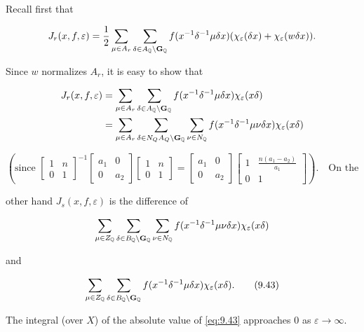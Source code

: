 Recall first that

\[
J_r(x, f, \varepsilon) = \frac{1}{2}\sum_{\mu \in A_r}\sum_{\delta \in A_{\mathbb{Q}} \backslash \mathbf{G}_{\mathbb{Q}}} f(x^{-1}\delta^{-1}\mu\delta x)(\chi_\varepsilon(\delta x) + \chi_\varepsilon(w\delta x)).
\]

Since $w$ normalizes $A_r$, it is easy to show that

\[
\begin{aligned}
J_r(x, f, \varepsilon) &= \sum_{\mu \in A_r}\sum_{\delta \in A_{\mathbb{Q}} \backslash \mathbf{G}_{\mathbb{Q}}} f(x^{-1}\delta^{-1}\mu\delta x)\chi_\varepsilon(x\delta)\\
&= \sum_{\mu \in A_r}\sum_{\delta \in N_Q A_Q \backslash \mathbf{G}_{\mathbb{Q}}}\sum_{\nu \in N_{\mathbb{Q}}} f(x^{-1}\delta^{-1}\mu\nu\delta x)\chi_\varepsilon(x\delta)
\end{aligned}
\]

\[
\left(\text{since } \begin{bmatrix} 1 & n \\ 0 & 1 \end{bmatrix}^{-1}\begin{bmatrix} a_1 & 0 \\ 0 & a_2 \end{bmatrix}\begin{bmatrix} 1 & n \\ 0 & 1 \end{bmatrix} = \begin{bmatrix} a_1 & 0 \\ 0 & a_2 \end{bmatrix}\begin{bmatrix} 1 & \frac{n(a_1 - a_2)}{a_1} \\ 0 & 1 \end{bmatrix}\right). \quad \text{On the}
\]

other hand $J_s(x, f, \varepsilon)$ is the difference of

\[
\sum_{\mu \in Z_{\mathbb{Q}}}\sum_{\delta \in B_{\mathbb{Q}} \backslash \mathbf{G}_{\mathbb{Q}}}\sum_{\nu \in N_{\mathbb{Q}}} f(x^{-1}\delta^{-1}\mu\nu\delta x)\chi_\varepsilon(x\delta)
\]

and

\begin{equation}\label{eq:9.43}
\sum_{\mu \in Z_{\mathbb{Q}}}\sum_{\delta \in B_{\mathbb{Q}} \backslash \mathbf{G}_{\mathbb{Q}}} f(x^{-1}\delta^{-1}\mu\delta x)\chi_\varepsilon(x\delta).\tag{9.43}
\end{equation}

\begin{lemma}\label{lem:9.11}

The integral (over $X$) of the absolute value of \eqref{eq:9.43} approaches 0 as $\varepsilon \to \infty$.

\end{lemma}

